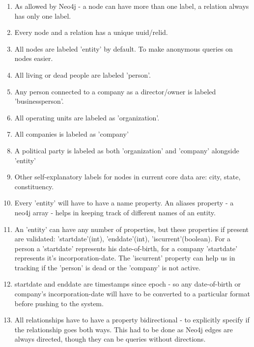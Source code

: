 \begin {enumerate}

\item As allowed by Neo4j - a node can have more than one label, a relation always has only one label.

\item Every node and a relation has a unique uuid/relid.

\item All nodes are labeled 'entity' by default. To make anonymous queries on nodes easier.

\item All living or dead people are labeled 'person'.

\item Any person connected to a company as a director/owner is labeled 'businessperson'.

\item All operating units are labeled as 'organization'.

\item All companies is labeled as 'company'

\item A political party is labeled as both 'organization' and 'company' alongside 'entity'

\item Other self-explanatory labels for nodes in current core data are: city, state, constituency.

\item Every 'entity' will have to have a name property. An aliases property - a neo4j array - helps in keeping track of different names of an entity.

\item An 'entity' can have any number of properties, but these properties if present are validated: 'startdate'(int), 'enddate'(int), 'iscurrent'(boolean). For a person a 'startdate' represents his date-of-birth, for a company 'startdate' represents it's incorporation-date. The 'iscurrent' property can help us in tracking if the 'person' is dead or the 'company' is not active.

\item startdate and enddate are timestamps since epoch - so any date-of-birth or company's incorporation-date will have to be converted to a particular format before pushing to the system.

\item All relationships have to have a property bidirectional - to explicitly specify if the relationship goes both ways. This had to be done as Neo4j edges are always directed, though they can be queries without directions.


\end{enumerate}
